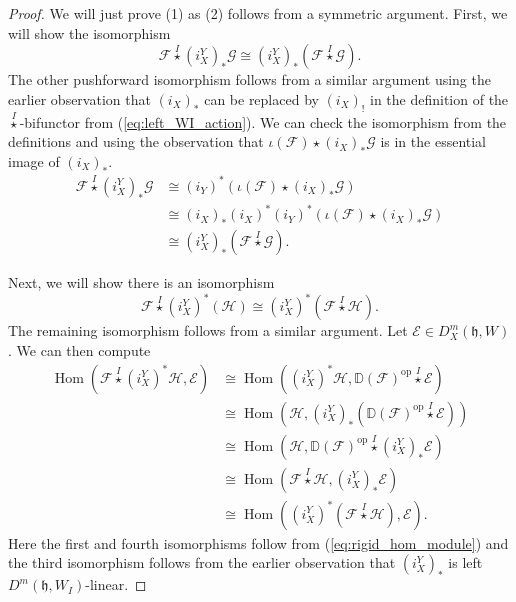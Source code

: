 \documentclass{amsart}
\newcommand{\scrF}{\mathcal{F}}
\newcommand{\scrG}{\mathcal{G}}
\newcommand{\scrH}{\mathcal{H}}
\newcommand{\scrE}{\mathcal{E}}
\DeclareMathOperator{\Hom}{Hom}
\newcommand{\BE}{D^m}
\newcommand{\fr}[1]{\mathfrak{#1}}
\DeclareMathOperator{\op}{op}
\newcommand{\wistar}{\stackrel{I}{\star}}
\newcommand{\DD}{\mathbb{D}}
\theoremstyle{definition}
\begin{document}
        \begin{proof}
                We will just prove (1) as (2) follows from a symmetric argument.
                First, we will show the isomorphism
                \[ \scrF \wistar (i_X^Y)_* \scrG \cong (i_X^Y)_* (\scrF \wistar \scrG).\]
                The other pushforward isomorphism follows from a similar argument using the earlier observation that $(i_X)_*$ can be replaced by $(i_X)_!$ in the definition of the $\wistar$-bifunctor from (\ref{eq:left_WI_action}).
                We can check the isomorphism from the definitions and using the observation that $\iota (\mathcal{F}) \star (i_X)_* \mathcal{G}$ is in the essential image of $(i_X)_*$.
                \begin{align*}
                        \mathcal{F} \wistar (i_X^Y)_* \scrG &\cong (i_Y)^* (\iota (\scrF) \star (i_X)_* \scrG) \\
                        &\cong (i_X)_* (i_X)^* (i_Y)^*  (\iota (\scrF) \star (i_X)_* \scrG) \\
                        &\cong (i_X^Y)_* (\scrF \wistar \scrG).
                \end{align*}
                
                Next, we will show there is an isomorphism
                \[ \scrF \wistar (i_X^Y)^* (\scrH) \cong (i_X^Y)^* (\scrF \wistar \scrH).\]
                The remaining isomorphism follows from a similar argument.
                Let $\scrE \in \BE_X (\fr{h}, W)$. We can then compute
                \begin{align*}
                        \Hom (\scrF \wistar (i_X^Y)^* \scrH, \scrE) &\cong \Hom ((i_X^Y)^* \scrH, \DD (\scrF)^{\op} \wistar \scrE) \\
                        &\cong \Hom ( \scrH, (i_X^Y)_* ( \DD (\scrF)^{\op}  \wistar \scrE )) \\
                        &\cong \Hom (\scrH,  \DD (\scrF)^{\op} \wistar (i_X^Y)_* \scrE) \\
                        &\cong \Hom (\scrF \wistar \scrH,  (i_X^Y)_* \scrE) \\
                        &\cong \Hom ((i_X^Y)^* (\scrF \wistar \scrH), \scrE).
                \end{align*}
                Here the first and fourth isomorphisms follow from (\ref{eq:rigid_hom_module}) and the third isomorphism follows from the earlier observation that $(i_X^Y)_*$ is left $\BE (\fr{h}, W_I)$-linear.
        \end{proof}
\end{document}
